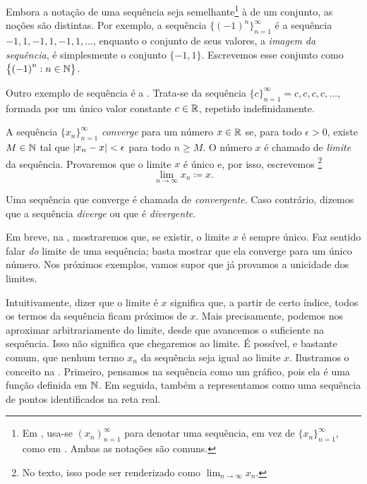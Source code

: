 Embora a notação de uma sequência seja semelhante\footnote{Em \cite{BS},
usa-se $(x_n)_{n=1}^\infty$ para denotar uma sequência, em vez de
$\{ x_n \}_{n=1}^\infty$, como em \cite{Rudin:baby}. Ambas as notações são
comuns.} à de um conjunto, as noções são distintas. Por exemplo, a sequência
$\bigl\{ {(-1)}^n \bigr\}_{n=1}^\infty$ é a sequência
$-1,1,-1,1,-1,1,\ldots$, enquanto o conjunto de seus valores, a
\emph{imagem da sequência}, é simplesmente
o conjunto $\{ -1, 1 \}$. Escrevemos esse conjunto como
$\bigl\{ {(-1)}^n : n \in {\mathbb{N}} \bigr\}$.

Outro exemplo de sequência é a \emph{}.
Trata-se da sequência $\{ c \}_{n=1}^\infty = c,c,c,c,\ldots$, formada por
um único valor constante $c \in {\mathbb{R}}$, repetido indefinidamente.


\begin{defn}
A sequência $\{ x_n \}_{n=1}^\infty$ \emph{converge} para um número
$x \in {\mathbb{R}}$ se, para todo $\epsilon > 0$, existe $M \in {\mathbb{N}}$ tal que
$\lvert {x_n - x} \rvert < \epsilon$ para todo $n \geq M$.
O número $x$ é chamado de \emph{limite} da sequência.
Provaremos que o limite $x$ é único e, por isso, escrevemos%
\footnote{No texto, isso pode ser renderizado como $\lim_{n\to\infty} x_n$.}
%
\begin{equation*}
\lim_{n\to \infty} x_n \coloneqq x .
\end{equation*}

Uma sequência que converge é chamada de \emph{convergente}.
Caso contrário, dizemos que a sequência \emph{diverge} ou que é
\emph{divergente}.
\end{defn}

Em breve, na , mostraremos que, se existir, o
limite $x$ é sempre único. Faz sentido falar \emph{do} limite de uma
sequência; basta mostrar que ela converge para um único número.
Nos próximos exemplos, vamos supor que já provamos a unicidade dos limites.

Intuitivamente, dizer que o limite é $x$ significa que, a partir de certo
índice, todos os termos da sequência ficam próximos de $x$. Mais
precisamente, podemos nos aproximar arbitrariamente do limite, desde que
avancemos o suficiente na sequência. Isso não significa que chegaremos ao
limite. É possível, e bastante comum, que nenhum termo $x_n$ da sequência
seja igual ao limite $x$.
Ilustramos o conceito na . Primeiro,
pensamos na sequência como um gráfico, pois ela é uma função definida em
${\mathbb{N}}$. Em seguida, também a representamos como uma sequência de pontos
identificados na reta real.


